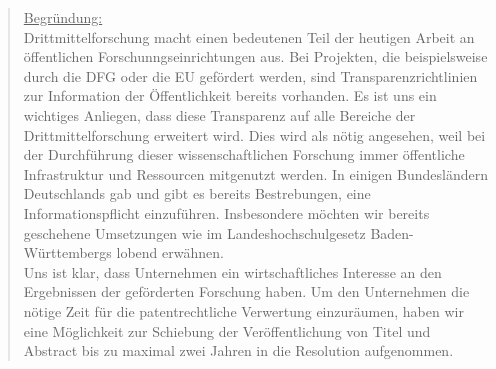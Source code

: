 \documentclass[10pt,oneside]{scrartcl}
\begin{document}
\begin{quote}
\underline{Begründung:}\\
Drittmittelforschung macht einen bedeutenen Teil der heutigen Arbeit an öffentlichen Forschunngseinrichtungen aus. Bei Projekten, die beispielsweise durch die DFG oder die EU gefördert werden, sind Transparenzrichtlinien zur Information der Öffentlichkeit bereits vorhanden. Es ist uns ein wichtiges Anliegen, dass diese Transparenz auf alle Bereiche der Drittmittelforschung erweitert wird. Dies wird als nötig angesehen, weil bei der Durchführung dieser wissenschaftlichen Forschung immer öffentliche Infrastruktur und Ressourcen mitgenutzt werden. In einigen Bundesländern Deutschlands gab und gibt es bereits Bestrebungen, eine Informationspflicht einzuführen. Insbesondere möchten wir bereits geschehene Umsetzungen wie im Landeshochschulgesetz Baden-Württembergs lobend erwähnen.\\
Uns ist klar, dass Unternehmen ein wirtschaftliches Interesse an den Ergebnissen der geförderten Forschung haben. Um den Unternehmen die nötige Zeit für die patentrechtliche Verwertung einzuräumen, haben wir eine Möglichkeit zur Schiebung der Veröffentlichung von Titel und Abstract bis zu maximal zwei Jahren in die Resolution aufgenommen.

\end{quote}
\end{document}
